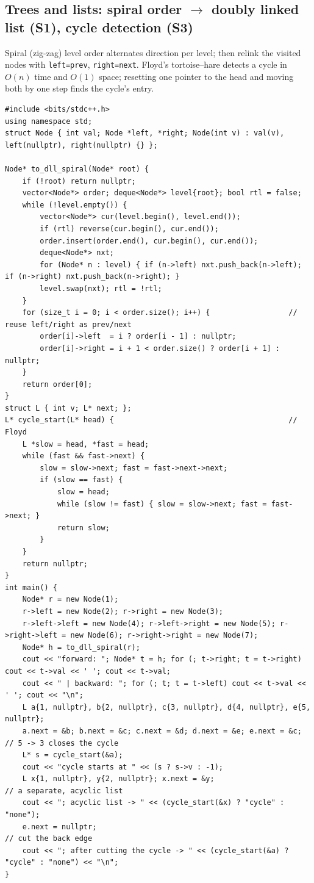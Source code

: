 \documentclass[10pt,a4paper,openany,oneside]{report}
\begin{document}
\subsection{Trees and lists: spiral order $\to$ doubly linked list (S1), cycle detection (S3)}
\begin{srcbox}
Spiral (zig-zag) level order alternates direction per level; then relink the visited nodes with \texttt{left=prev}, \texttt{right=next}. Floyd's tortoise--hare detects a cycle in $O(n)$ time and $O(1)$ space; resetting one pointer to the head and moving both by one step finds the cycle's entry.
\end{srcbox}
\begin{lstlisting}[language={[11]C++}]
#include <bits/stdc++.h>
using namespace std;
struct Node { int val; Node *left, *right; Node(int v) : val(v), left(nullptr), right(nullptr) {} };

Node* to_dll_spiral(Node* root) {
    if (!root) return nullptr;
    vector<Node*> order; deque<Node*> level{root}; bool rtl = false;
    while (!level.empty()) {
        vector<Node*> cur(level.begin(), level.end());
        if (rtl) reverse(cur.begin(), cur.end());
        order.insert(order.end(), cur.begin(), cur.end());
        deque<Node*> nxt;
        for (Node* n : level) { if (n->left) nxt.push_back(n->left); if (n->right) nxt.push_back(n->right); }
        level.swap(nxt); rtl = !rtl;
    }
    for (size_t i = 0; i < order.size(); i++) {                  // reuse left/right as prev/next
        order[i]->left  = i ? order[i - 1] : nullptr;
        order[i]->right = i + 1 < order.size() ? order[i + 1] : nullptr;
    }
    return order[0];
}
struct L { int v; L* next; };
L* cycle_start(L* head) {                                        // Floyd
    L *slow = head, *fast = head;
    while (fast && fast->next) {
        slow = slow->next; fast = fast->next->next;
        if (slow == fast) {
            slow = head;
            while (slow != fast) { slow = slow->next; fast = fast->next; }
            return slow;
        }
    }
    return nullptr;
}
int main() {
    Node* r = new Node(1);
    r->left = new Node(2); r->right = new Node(3);
    r->left->left = new Node(4); r->left->right = new Node(5); r->right->left = new Node(6); r->right->right = new Node(7);
    Node* h = to_dll_spiral(r);
    cout << "forward: "; Node* t = h; for (; t->right; t = t->right) cout << t->val << ' '; cout << t->val;
    cout << " | backward: "; for (; t; t = t->left) cout << t->val << ' '; cout << "\n";
    L a{1, nullptr}, b{2, nullptr}, c{3, nullptr}, d{4, nullptr}, e{5, nullptr};
    a.next = &b; b.next = &c; c.next = &d; d.next = &e; e.next = &c;      // 5 -> 3 closes the cycle
    L* s = cycle_start(&a);
    cout << "cycle starts at " << (s ? s->v : -1);
    L x{1, nullptr}, y{2, nullptr}; x.next = &y;                          // a separate, acyclic list
    cout << "; acyclic list -> " << (cycle_start(&x) ? "cycle" : "none");
    e.next = nullptr;                                                      // cut the back edge
    cout << "; after cutting the cycle -> " << (cycle_start(&a) ? "cycle" : "none") << "\n";
}
\end{lstlisting}
\end{document}
